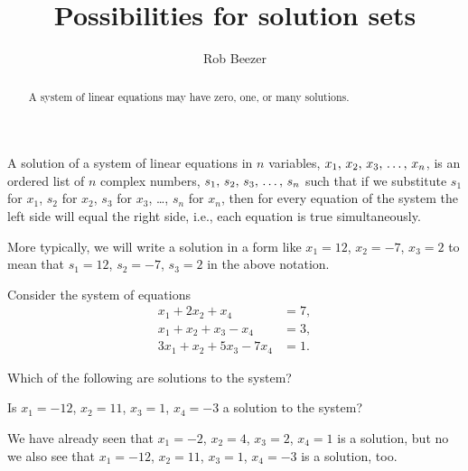 \documentclass{ximera}
\author{Rob Beezer}
\title{Possibilities for solution sets}
\begin{document}
\begin{abstract}
  A system of linear equations may have zero, one, or many solutions.
\end{abstract}
\maketitle

\begin{definition}
A solution of a system of linear equations in $n$ variables, ${x}_{1},\,{x}_{2},\,{x}_{3},\,\ldots,\,{x}_{n}$, is an ordered list of $n$ complex numbers, ${s}_{1},\,{s}_{2},\,{s}_{3},\,\ldots,\,{s}_{n}$ such that if we substitute $s_1$ for $x_1$, $s_2$ for $x_2$, $s_3$ for $x_3$, \ldots, $s_n$ for $x_n$,  then for every equation of the system the left side will equal the right side, i.e., each equation is true simultaneously.
\end{definition}

More typically, we will write a solution in a form like $x_1=12$, $x_2=-7$, $x_3=2$ to mean that $s_1=12$, $s_2=-7$, $s_3=2$ in the above notation.

\begin{exercise}
  Consider the system of equations
  \begin{align*}
    x_1+2x_2 + x_4&= 7,\\
    x_1+x_2+x_3-x_4&=3,\\
    3x_1+x_2+5x_3-7x_4&=1.
  \end{align*}
  
  \begin{question}
    Which of the following are solutions to the system?
    \begin{multipleChoice}
    \end{multipleChoice}
  
    \begin{question}
      Is $x_{1}=-12$, $x_{2}=11$, $x_{3}=1$, $x_{4}=-3$ a solution to the system?
      \begin{multipleChoice}
      \end{multipleChoice}
      
      \begin{feedback}
        We have already seen that $x_{1}=-2$, $x_{2}=4$, $x_{3}=2$,
        $x_{4}=1$ is a solution, but no we also see that $x_{1}=-12$,
        $x_{2}=11$, $x_{3}=1$, $x_{4}=-3$ is a solution, too.
      \end{feedback}
    \end{question}

  \end{question}
  
\end{exercise}
\end{document}
